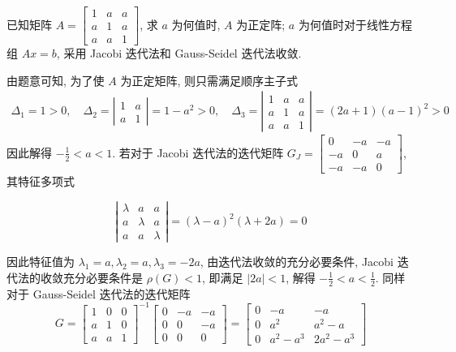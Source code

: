       \begin{tcolorbox}[enhanced,colback=blue!8!white,colframe=blue!25!white,breakable,title=2024]

已知矩阵 $ A=\left[\begin{array}{ccc}1 & a & a \\ a & 1 & a \\ a & a & 1\end{array}\right] $, 求 $ a $ 为何值时, $ A $ 为正定阵; $ a $ 为何值时对于线性方程组 $ A x=b $, 采用 Jacobi 迭代法和 Gauss-Seidel 迭代法收敛.
 \tcblower
 
 由题意可知, 为了使 $ A $ 为正定矩阵, 则只需满足顺序主子式
$$
\begin{array}{l}
\Delta_{1}=1>0, \quad \Delta_{2}=\left|\begin{array}{cc}
1 & a \\
a & 1
\end{array}\right|=1-a^{2}>0 ,\quad
\Delta_{3}=\left|\begin{array}{lll}
1 & a & a \\
a & 1 & a \\
a & a & 1
\end{array}\right|=(2 a+1)(a-1)^{2}>0
\end{array}
$$
因此解得 $ -\frac{1}{2}<a<1 $.
若对于 Jacobi 迭代法的迭代矩阵 $ G_{J}=\left[\begin{array}{ccc}0 & -a & -a \\ -a & 0 & a \\ -a & -a & 0\end{array}\right] $, 其特征多项式

$$
\left|\begin{array}{ccc}
\lambda & a & a \\
a & \lambda & a \\
a & a & \lambda
\end{array}\right|=(\lambda-a)^{2}(\lambda+2 a)=0
$$

因此特征值为 $ \lambda_{1}=a, \lambda_{2}=a, \lambda_{3}=-2 a $, 由迭代法收敛的充分必要条件, Jacobi 迭代法的收敛充分必要条件是 $ \rho(G)<1 $, 即满足 $ |2 a|<1 $, 解得 $ -\frac{1}{2}<a<\frac{1}{2} $.
同样对于 Gauss-Seidel 迭代法的迭代矩阵
$$
G=\left[\begin{array}{lll}
1 & 0 & 0 \\
a & 1 & 0 \\
a & a & 1
\end{array}\right]^{-1}\left[\begin{array}{ccc}
0 & -a & -a \\
0 & 0 & -a \\
0 & 0 & 0
\end{array}\right]=\left[\begin{array}{ccc}
0 & -a & -a \\
0 & a^{2} & a^{2}-a \\
0 & a^{2}-a^{3} & 2 a^{2}-a^{3}
\end{array}\right]
$$


\end{tcolorbox}
